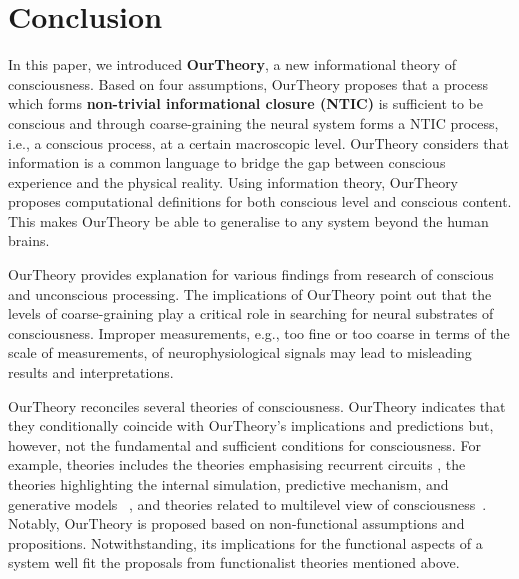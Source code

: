 \documentclass[utf8]{article}
\begin{document}
    \section{Conclusion}
    In this paper, we introduced \textbf{\acf{OurTheory}}, a new informational theory of consciousness. Based on four assumptions, \ac{OurTheory} proposes that a process which forms \textbf{non-trivial informational closure (NTIC)} is sufficient to be conscious and through coarse-graining the neural system forms a NTIC process, i.e., a conscious process, at a certain macroscopic level. \ac{OurTheory} considers that information is a common language to bridge the gap between conscious experience and the physical reality. Using information theory, \ac{OurTheory} proposes computational definitions for both conscious level and conscious content. This makes \ac{OurTheory} be able to generalise to any system beyond the human brains. 
    
    \ac{OurTheory} provides explanation for various findings from research of conscious and unconscious processing. The implications of \ac{OurTheory} point out that the levels of coarse-graining play a critical role in searching for neural substrates of consciousness. Improper measurements, e.g., too fine or too coarse in terms of the scale of measurements, of neurophysiological signals may lead to misleading results and interpretations. 
    
    
    \ac{OurTheory} reconciles several theories of consciousness. \ac{OurTheory} indicates that they conditionally coincide with \ac{OurTheory}'s implications and predictions but, however, not the fundamental and sufficient conditions for consciousness. For example, theories includes the theories emphasising recurrent circuits \citep{lamme2006towards, edelman1992bright}, the theories highlighting the internal simulation,  predictive mechanism, and generative models ~\citep{revonsuo2006inner, clark_2013,Hohwy2013,SethPP2014, kanai_chang_yu_de_abril_biehl_guttenberg_2019, seth2014predictive, seth2015presence}, and theories related to multilevel view of consciousness~\citep{pennartz2018consciousness,pennartz2015brain,prinz2007intermediate, jackendoff1987consciousness}. Notably, \ac{OurTheory} is proposed based on non-functional assumptions and propositions. Notwithstanding, its implications for the functional aspects of a system well fit the proposals from functionalist theories mentioned above. 
	
\end{document}
